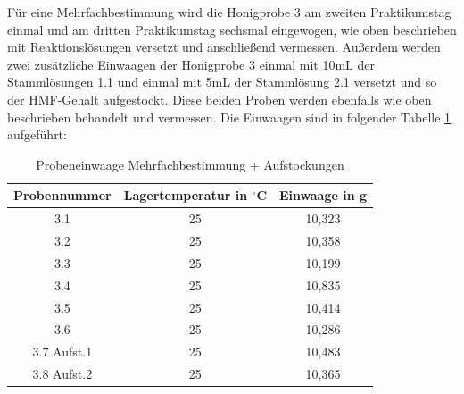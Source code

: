 Für eine Mehrfachbestimmung wird die Honigprobe 3 am zweiten Praktikumstag einmal und am dritten Praktikumstag sechsmal eingewogen, wie oben beschrieben mit Reaktionslösungen versetzt und anschließend vermessen. Außerdem werden zwei zusätzliche Einwaagen der Honigprobe 3 einmal mit 10mL der Stammlösungen 1.1 und einmal mit 5mL der Stammlösung 2.1 versetzt und so der HMF-Gehalt aufgestockt. Diese beiden Proben werden ebenfalls wie oben beschrieben behandelt und vermessen. Die Einwaagen sind in folgender Tabelle \ref{tab:Probeneinwaage Mehrfachbestimmung + Aufstockungen} aufgeführt:
\begin{table}[htbp]
	\centering
	\caption{Probeneinwaage Mehrfachbestimmung + Aufstockungen}
		\begin{tabular}{c|c|c} 
			Probennummer & Lagertemperatur in $^\circ$C & Einwaage in g\\
			\hline
			3.1 & 25 & 10,323\\
			\hline
			3.2 & 25 & 10,358\\
			\hline
			3.3 & 25 & 10,199\\
			\hline
			3.4 & 25 & 10,835\\
			\hline
			3.5 & 25 & 10,414\\
			\hline
			3.6 & 25 & 10,286\\
			\hline
			3.7 Aufst.1 & 25 & 10,483\\
			\hline
			3.8 Aufst.2 & 25 & 10,365\\
		\end{tabular}
	\label{tab:Probeneinwaage Mehrfachbestimmung + Aufstockungen}
\end{table}
